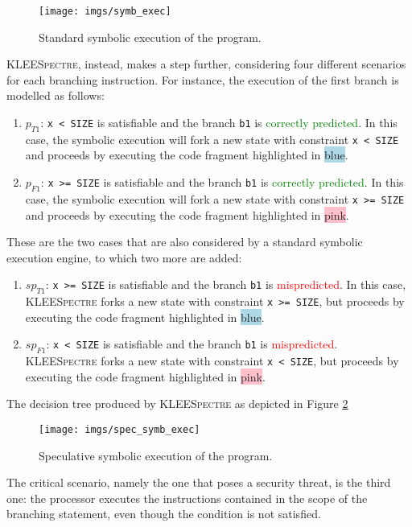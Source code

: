 \documentclass[target=mst,aauheader=aics]{thud}
\theoremstyle{definition}
\begin{document}
	\begin{figure}
		\centering
		\texttt{[image: imgs/symb\_exec]}
		\caption{Standard symbolic execution of the program.}
		\label{fig:standars_symb_exec}
	\end{figure}
	\textsc{KLEESpectre}, instead, makes a step further, considering four different scenarios for each branching instruction. For instance, the execution of the first branch is modelled as follows: 
	\begin{enumerate}
		\item $p_{T1}$: \texttt{x < SIZE} is satisfiable and the branch \texttt{b1} is \textcolor{green}{correctly predicted}. In this case, the symbolic execution will fork a new state with constraint \texttt{x < SIZE} and proceeds by executing the code fragment highlighted in \colorbox{lightblue}{blue}.
		\item $p_{F1}$: \texttt{x >= SIZE} is satisfiable and the branch \texttt{b1} is \textcolor{green}{correctly predicted}. In this case, the symbolic execution will fork a new state with constraint \texttt{x >= SIZE} and proceeds by executing the code fragment highlighted in \colorbox{pink}{pink}.
	\end{enumerate}
	These are the two cases that are also considered by a standard symbolic execution engine, to which two more are added:
	\begin{enumerate}[resume]
		\item $sp_{T1}$: \texttt{x >= SIZE} is satisfiable and the branch \texttt{b1} is \textcolor{red}{mispredicted}. In this case, \textsc{KLEESpectre} forks a new state with constraint \texttt{x >= SIZE}, but proceeds by executing the code fragment highlighted in \colorbox{lightblue}{blue}.
		\item $sp_{F1}$: \texttt{x < SIZE} is satisfiable and the branch \texttt{b1} is \textcolor{red}{mispredicted}. \textsc{KLEESpectre} forks a new state with constraint \texttt{x < SIZE}, but proceeds by executing the code fragment highlighted in \colorbox{pink}{pink}.
	\end{enumerate}
	The decision tree produced by \textsc{KLEESpectre} as depicted in Figure \ref{fig:spec_symb_exec}
	
	\begin{figure}
		\centering
		\texttt{[image: imgs/spec\_symb\_exec]}
		\caption{Speculative symbolic execution of the program.}
		\label{fig:spec_symb_exec}
	\end{figure}
	
	The critical scenario, namely the one that poses a security threat, is the third one: the processor executes the instructions contained in the scope of the branching statement, even though the condition is not satisfied. 
	
\end{document}
